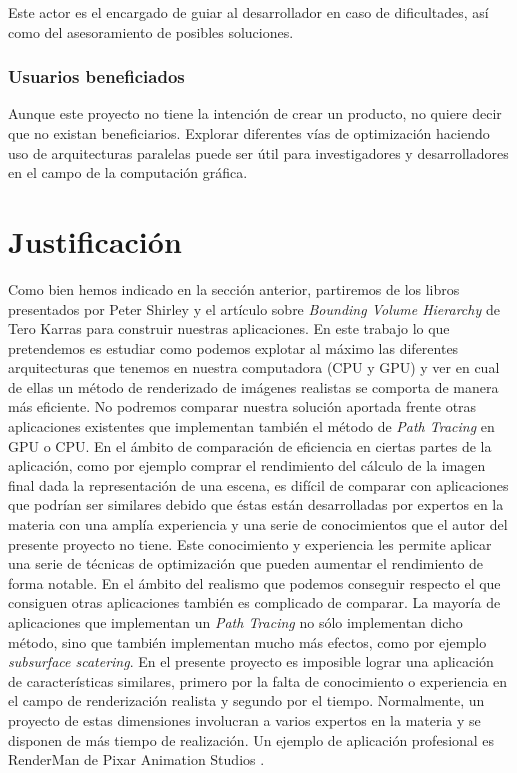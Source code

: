 \documentclass[titlepage,12pt]{report}
\begin{document}
Este actor es el encargado de guiar al desarrollador en caso de dificultades, así como del asesoramiento de posibles soluciones.

\subsubsection{Usuarios beneficiados}

Aunque este proyecto no tiene la intención de crear un producto, no quiere decir que no existan beneficiarios. Explorar diferentes vías de optimización haciendo uso de arquitecturas paralelas puede ser útil para investigadores y desarrolladores en el campo de la computación gráfica.

\section{Justificación}

Como bien hemos indicado en la sección anterior, partiremos de los libros presentados por Peter Shirley y el artículo sobre \textit{Bounding Volume Hierarchy} de Tero Karras para construir nuestras aplicaciones. En este trabajo lo que pretendemos es estudiar como podemos explotar al máximo las diferentes arquitecturas que tenemos en nuestra computadora (CPU y GPU) y ver en cual de ellas un método de renderizado de imágenes realistas se comporta de manera más eficiente. No podremos comparar nuestra solución aportada frente otras aplicaciones existentes que implementan también el método de \textit{Path Tracing} en GPU o CPU. En el ámbito de comparación de eficiencia en ciertas partes de la aplicación, como por ejemplo comprar el rendimiento del cálculo de la imagen final dada la representación de una escena, es difícil de comparar con aplicaciones que podrían ser similares debido que éstas están desarrolladas por expertos en la materia con una amplía experiencia y una serie de conocimientos que el autor del presente proyecto no tiene. Este conocimiento y experiencia les permite aplicar una serie de técnicas de optimización que pueden aumentar el rendimiento de forma notable. En el ámbito del realismo que podemos conseguir respecto el que consiguen otras aplicaciones también es complicado de comparar. La mayoría de aplicaciones que implementan un \textit{Path Tracing} no sólo implementan dicho método, sino que también implementan mucho más efectos, como por ejemplo \textit{subsurface scatering}. En el presente proyecto es imposible lograr una aplicación de características similares, primero por la falta de conocimiento o experiencia en el campo de renderización realista y segundo por el tiempo. Normalmente, un proyecto de estas dimensiones involucran a varios expertos en la materia y se disponen de más tiempo de realización. Un ejemplo de aplicación profesional es RenderMan de Pixar Animation Studios \citep{Christensen2018}.
\end{document}
